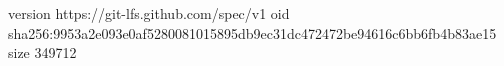 version https://git-lfs.github.com/spec/v1
oid sha256:9953a2e093e0af5280081015895db9ec31dc472472be94616c6bb6fb4b83ae15
size 349712
